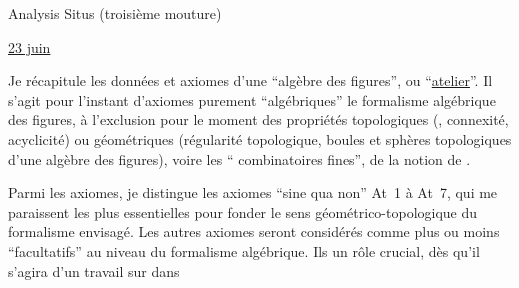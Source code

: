 \begin{center}Analysis Situs (troisième mouture)\end{center}

\uline{23 juin}

Je récapitule les données et axiomes d'une ``algèbre des figures'', ou ``\uline{atelier}''. \margin{\unsure{--}}Il s'agit pour l'instant d'axiomes purement ``algébriques''  le formalisme algébrique des figures, à l'exclusion pour le moment des propriétés topologiques (, connexité, acyclicité) ou  géométriques (régularité topologique, boules et sphères topologiques d'une algèbre des figures), voire les `` combinatoires fines'',  de la notion de .

Parmi les axiomes, je distingue les axiomes ``sine qua non'' At~1 à At~7, qui me paraissent les plus essentielles pour fonder le sens géométrico-topologique du formalisme envisagé. Les autres axiomes seront considérés comme plus ou moins ``facultatifs'' au niveau du formalisme algébrique. Ils    un rôle crucial, dès qu'il s'agira d'un travail sur  dans 

